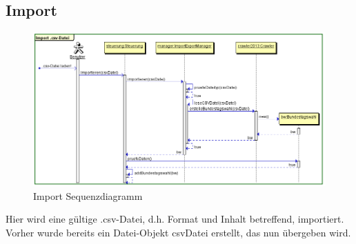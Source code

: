 \documentclass[12pt,a4paper,titlepage]{article}
\begin{document}
\subsection{Import}
\begin{figure}[!ht]
\includegraphics[scale=0.5]{Sequenzdiagramme/Import_Sequenzdiagramm.png} \caption{Import Sequenzdiagramm} 
\end{figure}
Hier wird eine gültige .csv-Datei, d.h. Format und Inhalt betreffend, importiert. Vorher wurde bereits ein Datei-Objekt csvDatei erstellt, das nun übergeben wird.

\newpage
\end{document}
